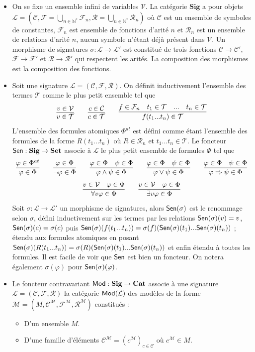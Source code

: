 \documentclass[11pt,a4paper]{report}
\newcommand{\La}{\mathcal{L}}
\newcommand{\M}{\mathcal{M}}
\newcommand{\ph}{\varphi}
\newcommand{\itemz}{\item[$\triangleright$]}
\newcommand{\F}{\mathcal{F}}
\newcommand{\gr}{\textbf}
\newcommand{\N}{\mathbb{N}}
\newcommand{\R}{\mathcal{R}}
\newcommand{\C}{\mathcal{C}}
\newcommand{\T}{\mathcal{T}}
\newcommand{\V}{\mathcal{V}}
\newcommand{\info}[1]{\text{{\fontfamily{lmss}\selectfont #1}}}
\newcommand{\Mod}{\info{Mod}}
\newcommand{\Sen}{\info{Sen}}
\newcommand{\1}{\mathbbm{1}}
\begin{document}
\begin{itemize}
\itemz On se fixe un ensemble infini de variables $\V$. La catégorie $\gr{Sig}$ a pour objets $\La = (\C, \F = \bigcup_{n\in\N^*} \F_n, \R = \bigcup_{n\in\N^*} \R_n)$ où $\C$ est un ensemble de symboles de constantes, $\F_n$ est ensemble de fonctions d'arité $n$ et $\R_n$ est un ensemble de relations d'arité $n$, aucun symbole n'étant déjà présent dans $\V$. Un morphisme de signatures $\sigma : \La \to \La'$ est constitué de trois fonctions $\C \to \C'$, $\F \to \F'$ et $\R \to \R'$ qui respectent les arités. La composition des morphismes est la composition des fonctions.
\itemz Soit une signature $\La = (\C, \F, \R)$. On définit inductivement l'ensemble des termes $\T$ comme le plus petit ensemble tel que
$$
\infer{v \in \T}{v \in \V}
\qquad
\infer{c \in \T}{c \in \C}
\qquad
\infer{f(t_1...t_n) \in \T}{f \in \F_n & t_1 \in \T & ... & t_n \in \T}
$$
L'ensemble des formules atomiques $\Phi^{at}$ est défini comme étant l'ensemble des formules de la forme $R(t_1...t_n)$ où $R \in \R_n$ et $t_1...t_n \in \T$. Le foncteur $\Sen : \gr{Sig} \to \gr{Set}$ associe à $\La$ le plus petit ensemble de formules $\Phi$ tel que
$$
\infer{\ph \in \Phi}{\ph \in \Phi^{at}}
\qquad
\infer{\neg \ph \in \Phi}{\ph \in \Phi}
\qquad
\infer{\ph \wedge \psi \in \Phi}{\ph \in \Phi & \psi \in \Phi }
\qquad
\infer{\ph \vee \psi \in \Phi}{\ph \in \Phi & \psi \in \Phi }
\qquad
\infer{\ph \Rightarrow \psi \in \Phi}{\ph \in \Phi & \psi \in \Phi }
$$
$$
\infer{\forall v \ph \in \Phi}{v \in \V & \ph \in \Phi}
\qquad
\infer{\exists v \ph \in \Phi}{v \in \V & \ph \in \Phi}
$$
Soit $\sigma : \La \to \La'$ un morphisme de signatures, alors $\Sen(\sigma)$ est le renommage selon $\sigma$, défini inductivement sur les termes par les relations $\Sen(\sigma)(v) = v$, $\Sen(\sigma)(c) = \sigma(c)$ puis $\Sen(\sigma)(f(t_1...t_n)) = \sigma(f)(\Sen(\sigma)(t_1)...\Sen(\sigma)(t_n))$ ; étendu aux formules atomiques en posant $\Sen(\sigma)(R(t_1...t_n)) = \sigma(R)(\Sen(\sigma)(t_1)...\Sen(\sigma)(t_n))$ et enfin étendu à toutes les formules. Il est facile de voir que $\Sen$ est bien un foncteur. On notera également $\sigma(\ph)$ pour $\Sen(\sigma)(\ph)$.
\itemz Le foncteur contravariant $\Mod : \gr{Sig} \to \gr{Cat}$ associe à une signature $\La = (\C, \F, \R)$ la catégorie $\Mod(\La)$ des modèles de la forme $\M = (M, \C^\M, \F^\M, \R^\M)$ constitués :
\begin{itemize}
\setlength\itemsep{-0.3em}
\item D'un ensemble $M$.
\item D'une famille d'éléments $\C^\M = (c^\M)_{c\in \C}$ où $c^\M \in M$.

\end{itemize}
\end{itemize}
\end{document}
